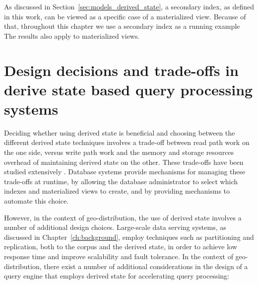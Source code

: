 As discussed in Section~\ref{sec:models_derived_state}, a secondary index,
as defined in this work, can be viewed as a specific case of a materialized view.
Because of that, throughout this chapter we use a secondary index as a running example
The results also apply to materialized views.

\section{Design decisions and trade-offs in derive state based query processing systems}

Deciding whether using derived state is beneficial and choosing between the different derived state techniques
involves a trade-off between read path work on the one side,
versus write path work and the memory and storage resources overhead of maintaining derived state on the other.
These trade-offs have been studied extensively \cite{valentin:db2advisor, chaudhuri:decadeselftuning}.
Database systems provide mechanisms for managing these trade-offs at runtime, by allowing the database administrator
to select which indexes and materialized views to create, and by providing mechanisms to automate this choice.

However, in the context of geo-distribution, the use of derived state involves a number of additional design choices.
Large-scale data serving systems, as discussed in Chapter~\ref{ch:background}, employ techniques such as partitioning and
replication, both to the corpus and the derived state, in order to achieve low response time and improve scalability and
fault tolerance.
In the context of geo-distribution, there exist a number of additional considerations in the design of a query engine
that employs derived state for accelerating query processing:


